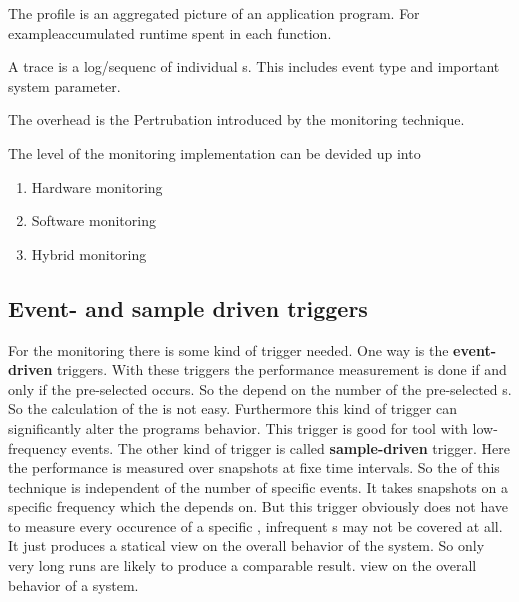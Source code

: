         \begin{definition}[Profile]
            \label{SerOpt:Profile}
            The profile is an aggregated picture of an application program. 
            For exampleaccumulated runtime spent in each function.
        \end{definition}
        
        \begin{definition}[Trace]
            \label{SerOpt:Trace}
            A trace is a log/sequenc of individual s.
            This includes event type and important system parameter.
        \end{definition}

        \begin{definition}[Overhead]
            \label{SerOpt:Overhead}
            The overhead is the Pertrubation introduced by the monitoring 
            technique.
        \end{definition}
        
        The level of the monitoring implementation can be devided up into
        \begin{enumerate}
            \item   Hardware monitoring
            \item   Software monitoring
            \item   Hybrid monitoring
        \end{enumerate}
        \subsection{Event- and sample driven triggers}
            For the monitoring there is some kind of trigger needed. One way
            is the \textbf{event-driven} triggers. With these triggers the
            performance measurement is done if and only if the pre-selected
             occurs. So the 
            depend on the number of the pre-selected s.
            So the calculation of the  is not easy.
            Furthermore this kind of trigger can significantly alter the 
            programs behavior. This trigger is good for tool with 
            low-frequency events. The other kind of trigger is called 
            \textbf{sample-driven} trigger. Here the performance is measured
            over snapshots at fixe time intervals. So the 
             of this technique is independent of the
            number of specific events. It takes snapshots on a specific
            frequency which the  depends on. But 
            this trigger obviously does not have to measure every occurence of
            a specific , infrequent 
            s may not be covered at all. It just
            produces a statical view on the overall behavior of the system.
            So only very long runs are likely to produce a comparable result.
            view on the overall behavior of a system.
            
